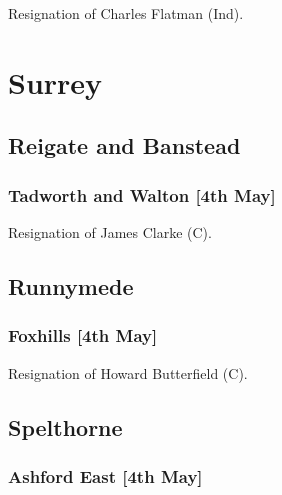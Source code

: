 \documentclass[a4paper,openany]{book}
\begin{document}
\begin{resultsiii}

Resignation of Charles Flatman (Ind).

\section{Surrey}

\subsection*{Reigate and Banstead}

\subsubsection*{Tadworth and Walton \hspace*{\fill}\nolinebreak[1]%
\enspace\hspace*{\fill}
[4th May]}


Resignation of James Clarke (C).

\subsection*{Runnymede}

\subsubsection*{Foxhills \hspace*{\fill}\nolinebreak[1]%
\enspace\hspace*{\fill}
[4th May]}


Resignation of Howard Butterfield (C).

\subsection*{Spelthorne}

\subsubsection*{Ashford East \hspace*{\fill}\nolinebreak[1]%
\enspace\hspace*{\fill}
[4th May]}


\end{resultsiii}
\end{document}

